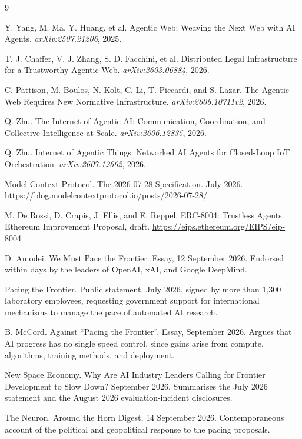 \documentclass[11pt]{article}
\begin{document}
\begin{thebibliography}{9}
\small

Y. Yang, M. Ma, Y. Huang, et al.
\newblock Agentic Web: Weaving the Next Web with AI Agents.
\newblock \emph{arXiv:2507.21206}, 2025.

T. J. Chaffer, V. J. Zhang, S. D. Facchini, et al.
\newblock Distributed Legal Infrastructure for a Trustworthy Agentic Web.
\newblock \emph{arXiv:2603.06884}, 2026.

C. Pattison, M. Boulos, N. Kolt, C. Li, T. Piccardi, and S. Lazar.
\newblock The Agentic Web Requires New Normative Infrastructure.
\newblock \emph{arXiv:2606.10711v2}, 2026.

Q. Zhu.
\newblock The Internet of Agentic AI: Communication, Coordination, and
Collective Intelligence at Scale.
\newblock \emph{arXiv:2606.12835}, 2026.

Q. Zhu.
\newblock Internet of Agentic Things: Networked AI Agents for Closed-Loop IoT
Orchestration.
\newblock \emph{arXiv:2607.12662}, 2026.

Model Context Protocol.
\newblock The 2026-07-28 Specification.
 July 2026. \url{https://blog.modelcontextprotocol.io/posts/2026-07-28/}

M. De Rossi, D. Crapis, J. Ellis, and E. Reppel.
\newblock ERC-8004: Trustless Agents.
\newblock Ethereum Improvement Proposal, draft.
\url{https://eips.ethereum.org/EIPS/eip-8004}

D. Amodei.
\newblock We Must Pace the Frontier.
\newblock Essay, 12 September 2026. Endorsed within days by the leaders of
OpenAI, xAI, and Google DeepMind.

Pacing the Frontier.
\newblock Public statement, July 2026, signed by more than 1{,}300 laboratory
employees, requesting government support for international mechanisms to manage
the pace of automated AI research.

B. McCord.
\newblock Against ``Pacing the Frontier''.
\newblock Essay, September 2026. Argues that AI progress has no single speed
control, since gains arise from compute, algorithms, training methods, and
deployment.

New Space Economy.
\newblock Why Are AI Industry Leaders Calling for Frontier Development to Slow
Down?
 September 2026. Summarises the July 2026 statement and the
August 2026 evaluation-incident disclosures.

The Neuron.
\newblock Around the Horn Digest, 14 September 2026.
\newblock Contemporaneous account of the political and geopolitical response to
the pacing proposals.

\end{thebibliography}
\end{document}
